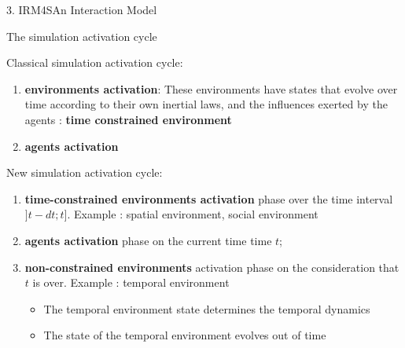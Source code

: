 \begin{frame}{3. IRM4S}{An Interaction Model}
\begin{block}{The simulation activation cycle}

\par \alert{Classical} simulation activation cycle:
\begin{enumerate}
    \item \textbf{environments activation}: These environments have states that evolve over time according to their own inertial laws, and the influences exerted by the agents : \textbf{time constrained environment}
    \item \textbf{agents activation}
\end{enumerate}
\vspace{.5cm}
\par \alert{New} simulation activation cycle:
\begin{enumerate}
    \item \textbf{time-constrained environments activation} phase over the time interval $]t-dt; t]$. Example : spatial environment, social environment
    \item \textbf{agents activation} phase on the current time time $t$;
    \item \textbf{non-constrained environments} activation phase on the consideration that $t$ is over. Example : temporal environment
    \begin{itemize}
        \item The temporal environment state determines the temporal dynamics
        \item The state of the temporal environment evolves out of time
    \end{itemize}
\end{enumerate}

\end{block}


\end{frame}
